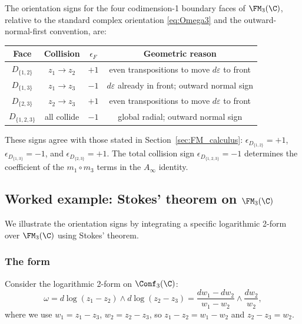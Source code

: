 \begin{proposition}[Orientation signs for $k=3$]
\label{prop:orient-signs-k3}
The orientation signs for the four codimension-1 boundary faces of $\FM_3(\C)$, relative to the standard complex orientation \eqref{eq:Omega3} and the outward-normal-first convention, are:
\begin{center}
\renewcommand{\arraystretch}{1.3}
\begin{tabular}{c|c|c|c}
\textbf{Face} & \textbf{Collision} & $\epsilon_F$ & \textbf{Geometric reason} \\
\hline
$D_{\{1,2\}}$ & $z_1\to z_2$ & $+1$ & even transpositions to move $d\varepsilon$ to front \\
$D_{\{1,3\}}$ & $z_1\to z_3$ & $-1$ & $d\varepsilon$ already in front; outward normal sign \\
$D_{\{2,3\}}$ & $z_2\to z_3$ & $+1$ & even transpositions to move $d\varepsilon$ to front \\
$D_{\{1,2,3\}}$ & all collide & $-1$ & global radial; outward normal sign
\end{tabular}
\end{center}
\end{proposition}

\begin{remark}
These signs agree with those stated in Section~\ref{sec:FM_calculus}:
\(\epsilon_{D_{\{1,2\}}}=+1\),
\(\epsilon_{D_{\{1,3\}}}=-1\), and
\(\epsilon_{D_{\{2,3\}}}=+1\).  The total collision sign
\(\epsilon_{D_{\{1,2,3\}}}=-1\) determines the coefficient of the
\(m_1\circ m_3\) terms in the \(A_\infty\) identity.
\end{remark}

\subsection{\texorpdfstring{Worked example: Stokes' theorem on $\FM_3(\C)$}{Worked example: Stokes' theorem on FM 3(C)}}
\label{subsec:stokes-FM3}

We illustrate the orientation signs by integrating a specific logarithmic 2-form over $\FM_3(\C)$ using Stokes' theorem.

\subsubsection{The form}

Consider the logarithmic 2-form on $\Conf_3(\C)$:
\begin{equation}
\label{eq:stokes-example-form}
\omega = d\log(z_1 - z_2)\wedge d\log(z_2 - z_3) = \frac{dw_1 - dw_2}{w_1 - w_2}\wedge \frac{dw_2}{w_2},
\end{equation}
where we use $w_1 = z_1 - z_3$, $w_2 = z_2 - z_3$, so $z_1 - z_2 = w_1 - w_2$ and $z_2 - z_3 = w_2$.

